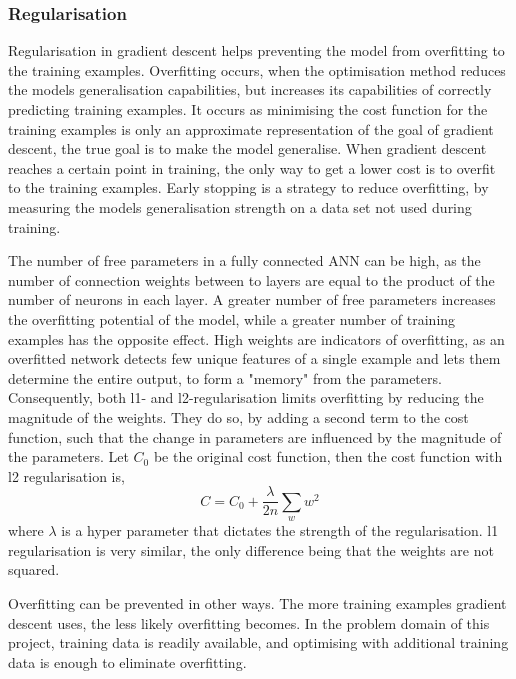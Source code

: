 \subsubsection{Regularisation}
\label{sec:regularisation}
Regularisation in gradient descent helps preventing the model from overfitting to the training examples. Overfitting occurs, when the optimisation method reduces the models generalisation capabilities, but increases its capabilities of correctly predicting training examples. It occurs as minimising the cost function for the training examples is only an approximate representation of the goal of gradient descent,  the true goal is to make the model generalise. When gradient descent reaches a certain point in training, the only way to get a lower cost is to overfit to the training examples. Early stopping is a strategy to reduce overfitting, by measuring the models generalisation strength on a data set not used during training.

The number of free parameters in a fully connected ANN can be high, as the number of connection weights between to layers are equal to the product of the number of neurons in each layer. A greater number of free parameters increases the overfitting potential of the model, while a greater number of training examples has the opposite effect.
High weights are indicators of overfitting, as an overfitted network detects few unique features of a single example and lets them determine the entire output, to form a "memory" from the parameters. Consequently, both l1- and l2-regularisation limits overfitting by reducing the magnitude of the weights. They do so, by adding a second term to the cost function, such that the change in parameters are influenced by the magnitude of the parameters. Let $C_0$ be the original cost function, then the cost function with l2 regularisation is,
$$C = C_0 + \frac{\lambda}{2n}\sum_{w} w^2 $$
where $\lambda$ is a hyper parameter that dictates the strength of the regularisation. l1 regularisation is very similar, the only difference being that the weights are not squared.

Overfitting can be prevented in other ways. The more training examples gradient descent uses, the less likely overfitting becomes. In the problem domain of this project, training data is readily available, and optimising with additional training data is enough to eliminate overfitting.

